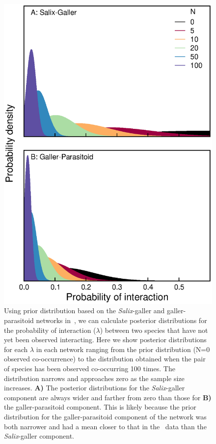 \documentclass[12pt]{article}
\begin{document}
      \begin{figure}[ht]
        \label{Salix_pdfs}
        \caption{Using prior distribution based on the \emph{Salix}-galler and galler-parasitoid networks in~\citet{Barbour2016}, we can calculate posterior distributions for the probability of interaction ($\lambda$) between two species that have not yet been observed interacting. Here we show posterior distributions for each $\lambda$ in each network ranging from the prior distribution (N=0 observed co-occurrence) to the distribution obtained when the pair of species has been observed co-occurring 100 times. The distribution narrows and approaches zero as the sample size increases. \textbf{A)} The posterior distributions for the \emph{Salix}-galler component are always wider and farther from zero than those for \textbf{B)} the galler-parasitoid component. This is likely because the prior distribution for the galler-parasitoid component of the network was both narrower and had a mean closer to that in the~\citet{Kopelke2017} data than the \emph{Salix}-galler component.}
        \includegraphics*[width=.8\textwidth]{figures/Salix_Galler_pdfs_increasing_N.eps}
        \end{figure}
\end{document}
